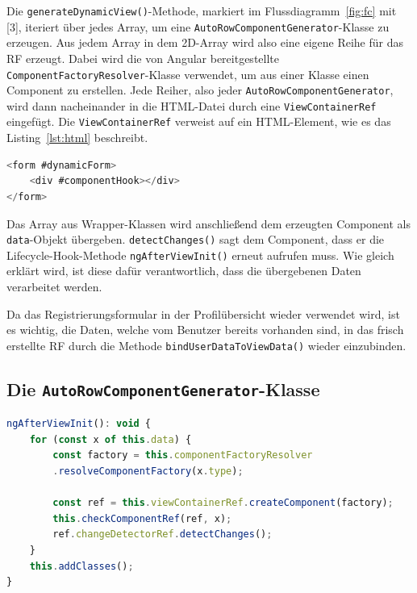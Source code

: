 Die \texttt{generateDynamicView()}-Methode, markiert im Flussdiagramm~\ref{fig:fc} mit [3], iteriert über jedes Array, um eine \texttt{AutoRowComponentGenerator}-Klasse zu erzeugen. Aus jedem Array in dem 2D-Array wird also eine eigene Reihe für das RF erzeugt. Dabei wird die von Angular bereitgestellte \texttt{ComponentFactoryResolver}-Klasse verwendet, um aus einer Klasse einen Component zu erstellen. 
Jede Reiher, also jeder \texttt{AutoRowComponentGenerator}, wird dann nacheinander in die HTML-Datei durch eine \texttt{ViewContainerRef} eingefügt. Die \texttt{ViewContainerRef} verweist auf ein HTML-Element, wie es das Listing~\ref{lst:html} beschreibt.

\begin{lstlisting}[caption={ViewContainerRef verweist auf \#componentHook},captionpos=b, language=JavaScript,label={lst:html}]
<form #dynamicForm>
	<div #componentHook></div>
</form>
\end{lstlisting}

Das Array aus Wrapper-Klassen wird anschließend dem erzeugten Component als \texttt{data}-Objekt übergeben. \texttt{detectChanges()} sagt dem Component, dass er die Lifecycle-Hook-Methode \texttt{ngAfterViewInit()} erneut aufrufen muss. Wie gleich erklärt wird, ist diese dafür verantwortlich, dass die übergebenen Daten verarbeitet werden.

Da das Registrierungsformular in der Profilübersicht wieder verwendet wird, ist es wichtig, die Daten, welche vom Benutzer bereits vorhanden sind, in das frisch erstellte RF durch die Methode \texttt{bindUserDataToViewData()} wieder einzubinden.

\subsection{Die \texttt{AutoRowComponentGenerator}-Klasse}

\begin{lstlisting}[caption={Die \texttt{ngAfterViewInit()}-Methode der \texttt{AutoRowComponentGenerator}-Klasse},captionpos=b, language=JavaScript,label={lst:nginARCG}]
ngAfterViewInit(): void {
	for (const x of this.data) {
		const factory = this.componentFactoryResolver
		.resolveComponentFactory(x.type);
		
		const ref = this.viewContainerRef.createComponent(factory);
		this.checkComponentRef(ref, x);
		ref.changeDetectorRef.detectChanges();
	}
	this.addClasses();
}
\end{lstlisting}

